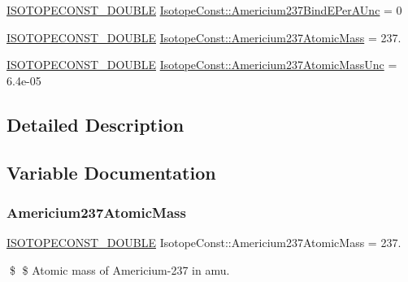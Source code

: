 \begin{DoxyCompactItemize}
\mbox{\hyperlink{group___isotope_const-_macros_ga8f45a7272ce02c0b4c65c44636ed719a}{I\+S\+O\+T\+O\+P\+E\+C\+O\+N\+S\+T\+\_\+\+D\+O\+U\+B\+LE}} \mbox{\hyperlink{group___isotope_const-_americium-_am237_gad4f748e302d0f0ad59d52d0f123be240}{Isotope\+Const\+::\+Americium237\+Bind\+E\+Per\+A\+Unc}} = 0
\item 
\mbox{\hyperlink{group___isotope_const-_macros_ga8f45a7272ce02c0b4c65c44636ed719a}{I\+S\+O\+T\+O\+P\+E\+C\+O\+N\+S\+T\+\_\+\+D\+O\+U\+B\+LE}} \mbox{\hyperlink{group___isotope_const-_americium-_am237_gafe6a24637f24315f88bb59ddc310bee7}{Isotope\+Const\+::\+Americium237\+Atomic\+Mass}} = 237.
\item 
\mbox{\hyperlink{group___isotope_const-_macros_ga8f45a7272ce02c0b4c65c44636ed719a}{I\+S\+O\+T\+O\+P\+E\+C\+O\+N\+S\+T\+\_\+\+D\+O\+U\+B\+LE}} \mbox{\hyperlink{group___isotope_const-_americium-_am237_ga6d0e1ee34cd29334c5fe767258fd5b19}{Isotope\+Const\+::\+Americium237\+Atomic\+Mass\+Unc}} = 6.\+4e-\/05
\end{DoxyCompactItemize}


\subsection{Detailed Description}


\subsection{Variable Documentation}
\mbox{\label{group___isotope_const-_americium-_am237_gafe6a24637f24315f88bb59ddc310bee7}} 
\subsubsection{\texorpdfstring{Americium237\+Atomic\+Mass}{Americium237AtomicMass}}
{\footnotesize\ttfamily \mbox{\hyperlink{group___isotope_const-_macros_ga8f45a7272ce02c0b4c65c44636ed719a}{I\+S\+O\+T\+O\+P\+E\+C\+O\+N\+S\+T\+\_\+\+D\+O\+U\+B\+LE}} Isotope\+Const\+::\+Americium237\+Atomic\+Mass = 237.}

\$ \$ Atomic mass of Americium-\/237 in amu. \mbox{\label{group___isotope_const-_americium-_am237_ga6d0e1ee34cd29334c5fe767258fd5b19}} 
